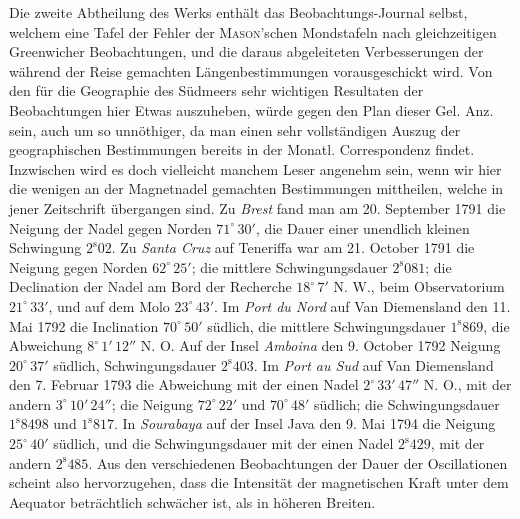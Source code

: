 Die zweite Abtheilung des Werks enthält das Beobachtungs-Journal selbst, welchem eine Tafel der Fehler der \textsc{Mason}'schen Mondstafeln nach gleichzeitigen Greenwicher Beobachtungen, und die daraus abgeleiteten Verbesserungen der während der Reise gemachten Längenbestimmungen vorausgeschickt wird. Von den für die Geographie des Südmeers sehr wichtigen Resultaten der Beobachtungen hier Etwas auszuheben, würde gegen den Plan dieser Gel. Anz. sein, auch um so unnöthiger, da man einen sehr vollständigen Auszug der geographischen Bestimmungen bereits in der Monatl. Correspondenz findet. Inzwischen wird es doch vielleicht manchem Leser angenehm sein, wenn wir hier die wenigen an der Magnetnadel gemachten Bestimmungen mittheilen, welche in jener Zeitschrift übergangen sind. Zu \emph{Brest} fand man am 20. September 1791 die Neigung der Nadel gegen Norden $71^\circ\,30'$, die Dauer einer unendlich kleinen Schwingung $2^{\mathrm s}02$. Zu \emph{Santa Cruz} auf Teneriffa war am 21. October 1791 die Neigung gegen Norden $62^\circ\,25'$; die mittlere Schwingungsdauer $2^{\mathrm s}081$; die Declination der Nadel am Bord der Recherche $18^\circ\,7'$ N. W., beim Observatorium $21^\circ\,33'$, und auf dem Molo $23^\circ\,43'$. Im \emph{Port du Nord} auf Van Diemensland den 11. Mai 1792 die Inclination $70^\circ\,50'$ südlich, die mittlere Schwingungsdauer $1^{\mathrm s}869$, die Abweichung $8^\circ\,1'\,12''$ N. O. Auf der Insel \emph{Amboina} den 9. October 1792 Neigung $20^\circ\,37'$ südlich, Schwingungsdauer $2^{\mathrm s}403$. Im \emph{Port au Sud} auf Van Diemensland den 7. Februar 1793 die Abweichung mit der einen Nadel $2^\circ\,33'\,47''$ N. O., mit der andern $3^\circ\,10'\,24''$; die Neigung $72^\circ\,22'$ und $70^\circ\,48'$ südlich; die Schwingungsdauer $1^{\mathrm s}8498$ und $1^{\mathrm s}817$. In \emph{Sourabaya} auf der Insel Java den 9. Mai 1794 die Neigung $25^\circ\,40'$ südlich, und die Schwingungsdauer mit der einen Nadel $2^{\mathrm s}429$, mit der andern $2^{\mathrm s}485$. Aus den verschiedenen Beobachtungen der Dauer der Oscillationen scheint also hervorzugehen, dass die Intensität der magnetischen Kraft unter dem Aequator beträchtlich schwächer ist, als in höheren Breiten.
